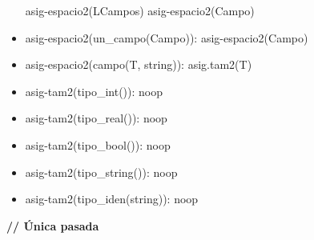 \documentclass[11pt]{article}
\begin{document}
\begin{itemize}
                \subitem asig-espacio2(LCampos)
                \subitem asig-espacio2(Campo)
            \item asig-espacio2(un\_campo(Campo)): 
                \subitem asig-espacio2(Campo)
            \item asig-espacio2(campo(T, string)): 
                \subitem asig.tam2(T)
            \item asig-tam2(tipo\_int()): 
                \subitem noop
            \item asig-tam2(tipo\_real()): 
                \subitem noop
            \item asig-tam2(tipo\_bool()): 
                \subitem noop
            \item asig-tam2(tipo\_string()): 
                \subitem noop
            \item asig-tam2(tipo\_iden(string)): 
                \subitem noop
        \end{itemize} 
        \textbf{\/// Única pasada}
\end{document}

